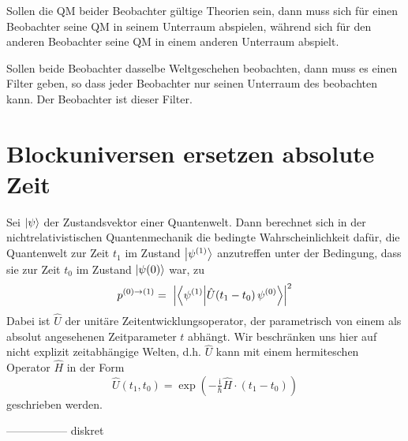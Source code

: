 \documentclass[12pt]{article}
\begin{document}
Sollen die QM beider Beobachter gültige Theorien sein, dann muss sich für einen Beobachter seine QM in seinem Unterraum abspielen, während sich für den anderen Beobachter seine QM in einem anderen Unterraum abspielt. 

Sollen beide Beobachter dasselbe Weltgeschehen beobachten, dann muss es einen Filter geben, so dass jeder Beobachter nur seinen Unterraum des beobachten kann. Der Beobachter ist dieser Filter.

\section{Blockuniversen ersetzen absolute Zeit}
Sei $\ket{\psi}$ der Zustandsvektor einer Quantenwelt. Dann berechnet sich in der nichtrelativistischen Quantenmechanik die bedingte Wahrscheinlichkeit dafür, die Quantenwelt zur Zeit $t_1$ im Zustand $\ket{\psi^{(1)}}$ anzutreffen unter der Bedingung, dass sie zur Zeit $t_0$ im Zustand  $\ket{\psi{(0)}}$ war, zu
\begin{equation} 
\label{eq:conditional_probability}
p^{(0)\rightarrow(1)} =\ \Bigl| \bra{\psi^{(1)}}\ket{\hat{U}(t_1-t_0)\,\psi^{(0)}} \Bigr|^2
\end{equation}
Dabei ist $\hat{U}$ der unitäre Zeitentwicklungsoperator, der parametrisch von einem als absolut angesehenen Zeitparameter $t$ abhängt. Wir beschränken uns hier auf nicht explizit zeitabhängige Welten, d.h. $\hat{U}$ kann mit einem hermiteschen Operator $\hat{H}$ in der Form
\begin{equation}
\label{eq:time_evolution}
\hat{U}(t_1,t_0)=\exp \left(-\tfrac {\mathrm {i} }{\hbar}\hat{H}\cdot (t_1-t_0)\right)
\end{equation}
geschrieben werden. 


-----------------
diskret
\end{document}
